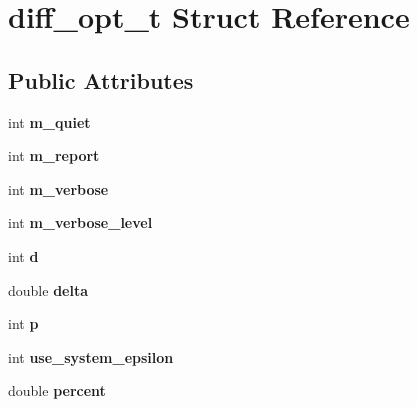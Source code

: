 \hypertarget{structdiff__opt__t}{}\section{diff\+\_\+opt\+\_\+t Struct Reference}
\label{structdiff__opt__t}
\subsection*{Public Attributes}
\begin{DoxyCompactItemize}
\item 
\mbox{\label{structdiff__opt__t_a30c317c0ae8ea31371e610686c273d6a}} 
int {\bfseries m\+\_\+quiet}
\item 
\mbox{\label{structdiff__opt__t_a39ad3e761cb78f431a94f3a638495995}} 
int {\bfseries m\+\_\+report}
\item 
\mbox{\label{structdiff__opt__t_aeafa5ffcae2abcd66e4d9d136330fba0}} 
int {\bfseries m\+\_\+verbose}
\item 
\mbox{\label{structdiff__opt__t_af1e895e1f4ea192e08732bbc16908e5d}} 
int {\bfseries m\+\_\+verbose\+\_\+level}
\item 
\mbox{\label{structdiff__opt__t_a7828183ee98e58b3ff31843f3e6e7061}} 
int {\bfseries d}
\item 
\mbox{\label{structdiff__opt__t_a5516f44a668e2a5b66d99004f9d97ccf}} 
double {\bfseries delta}
\item 
\mbox{\label{structdiff__opt__t_a3dee2d9b3027c41010de5673ea908ded}} 
int {\bfseries p}
\item 
\mbox{\label{structdiff__opt__t_a9355de73fc8e87bb528ebcc484e86c4f}} 
int {\bfseries use\+\_\+system\+\_\+epsilon}
\item 
\mbox{\label{structdiff__opt__t_a7b2b2b9011b6d5d75e8ec334d90b09d6}} 
double {\bfseries percent}
\item 
\mbox{\label{structdiff__opt__t_a53a3531c5b3ac2cf9456dbd1c635d700}} 

\end{DoxyCompactItemize}
